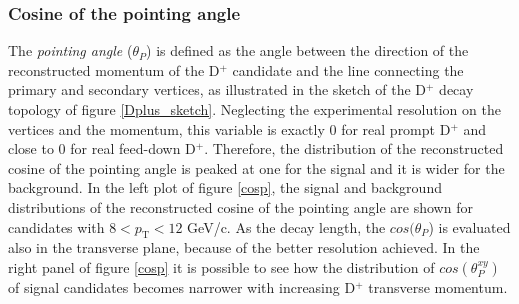 \documentclass[b5paper,10pt,twoside,oldstyle,classica]{toptesi}
\newcommand{\pt}{p_\text{T}}
\begin{document}
\subsubsection{Cosine of the pointing angle} 
The \textit{pointing angle} ($\theta_P$) is defined as the angle between the direction of the reconstructed momentum of the D$^+$ candidate and the line connecting the primary and secondary vertices, as illustrated in the sketch of the D$^+$ decay topology of figure \ref{Dplus_sketch}. Neglecting the experimental resolution on the vertices and the momentum, this variable is exactly 0 for real prompt D$^+$ and close to 0 for real feed-down D$^+$. Therefore, the distribution of the reconstructed cosine of the pointing angle is peaked at one for the signal and it is wider for the background. In the left plot of figure \ref{cosp}, the signal and background distributions of the reconstructed cosine of the pointing angle are shown for candidates with $8<\pt<12$ GeV/c. As the decay length, the $cos(\theta_P$) is evaluated also in the transverse plane, because of the better resolution achieved. In the right panel of figure \ref{cosp} it is possible to see how the distribution of $cos(\theta_P^{xy})$ of signal candidates becomes narrower with increasing D$^+$ transverse momentum. 
\end{document}
